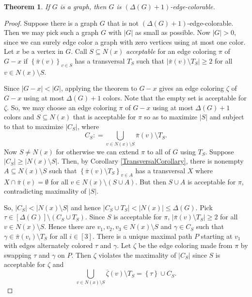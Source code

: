 \documentclass{tufte-book} %
\theoremstyle{plain}
\newtheorem{theorem}{Theorem}
\newcommand{\set}[1]{\left\{ #1 \right\}}
\newcommand{\card}[1]{\left|#1\right|}
\newcommand{\irange}[1]{\left[#1\right]}
\newcommand{\parens}[1]{\left( #1 \right)}
\newcommand{\DefinedAs}{\mathrel{\mathop:}=}
\begin{document}
\begin{theorem}
If $G$ is a graph, then $G$ is $\parens{\Delta(G) + 1}$-edge-colorable.
\end{theorem}
\begin{proof}
Suppose there is a graph $G$ that is not $(\Delta(G) + 1)$-edge-colorable.  Then we may pick such a graph $G$ with $\card{G}$ as small as possible.
Now $\card{G} > 0$, since we can surely edge color a graph with zero vertices using at most one color. Let $x$ be a vertex in $G$.   Call $S\subseteq N(x)$ \emph{acceptable} for 
an edge coloring $\pi$ of $G-x$ if $\set{\bar{\pi}(v)}_{v \in S}$ has a transversal $T_S$ such that $\card{\bar{\pi}(v) \setminus T_S} \ge 2$ for all $v \in N(x)\setminus S$.

Since $\card{G-x} < \card{G}$, applying the theorem to $G-x$ gives an edge coloring $\zeta$ of $G-x$ using at most $\Delta(G) + 1$ colors. 
Note that the empty set is acceptable for $\zeta$.  So, we may choose an edge coloring $\pi$ of $G-x$ using at most $\Delta(G) + 1$ colors and $S\subseteq N(x)$ 
that is acceptable for $\pi$ so as to maximize $\card{S}$ and subject to that to maximize $\card{C_S}$, where
\[C_S \DefinedAs \bigcup_{v \in N(x) \setminus S} \bar{\pi}(v) \setminus T_S.\]
Now $S \neq N(x)$ for otherwise we can extend $\pi$ to all of $G$ using $T_S$.  Suppose $\card{C_S}\ge \card{N(x) \setminus S}$.
Then, by Corollary \ref{TransversalCorollary}, there is nonempty $A \subseteq N(x) \setminus S$ such that $\set{\bar{\pi}(v)\setminus T_S}_{v \in A}$ has
a transversal $X$ where $X \cap \bar{\pi}(v) = \emptyset$ for all $v \in N(x) \setminus \parens{S \cup A}$.  But then $S\cup A$ is acceptable for $\pi$, contradicting
maximality of $\card{S}$.  

So, $\card{C_S}< \card{N(x) \setminus S}$ and hence $\card{C_S \cup T_S} < \card{N(x)} \le \Delta(G)$.  
Pick $\tau \in \irange{\Delta(G)} \setminus \parens{C_S \cup T_S}$.  Since $S$ is acceptable for $\pi$, $\card{\bar{\pi}(v) \setminus T_S} \ge 2$ for all $v \in N(x)\setminus S$.
Hence there are $v_1, v_2, v_3 \in N(x)\setminus S$ and $\gamma \in C_S$ such that $\gamma \in \bar{\pi}(v_i) \setminus T_S$ for all $i \in \irange{3}$.
There is a unique maximal path $P$ starting at $v_1$ with edges alternately colored $\tau$ and $\gamma$.  
Let $\zeta$ be the edge coloring made from $\pi$ by swapping $\tau$ and $\gamma$ on $P$.  Then $\zeta$ violates the maximality of $\card{C_S}$ since $S$ is acceptable for $\zeta$ and
\[\bigcup_{v \in N(x) \setminus S} \bar{\zeta}(v) \setminus T_S = \set{\tau} \cup C_S.\]

\end{proof}
\end{document}
